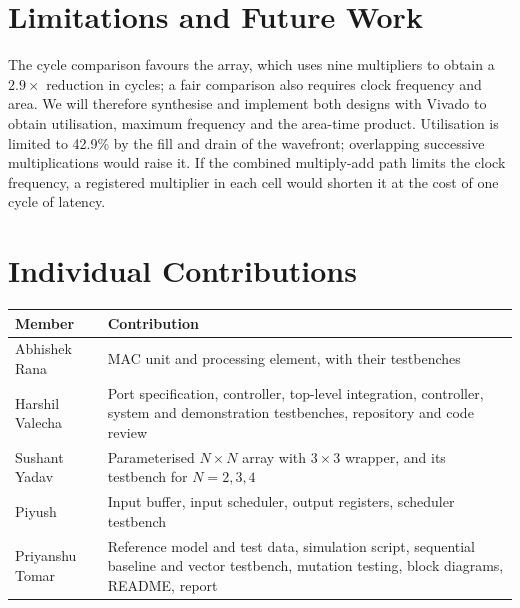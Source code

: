 \documentclass[conference]{IEEEtran}
\begin{document}
\section{Limitations and Future Work}
\label{sec:future}
The cycle comparison favours the array, which uses nine multipliers to obtain a $2.9\times$ reduction in cycles; a fair comparison also requires clock frequency and area. We will therefore synthesise and implement both designs with Vivado to obtain utilisation, maximum frequency and the area-time product. Utilisation is limited to 42.9\% by the fill and drain of the wavefront; overlapping successive multiplications would raise it. If the combined multiply-add path limits the clock frequency, a registered multiplier in each cell would shorten it at the cost of one cycle of latency.

\section{Individual Contributions}
\label{sec:contrib}
\begin{center}
\begin{tabular}{@{}lp{}@{}}
\toprule
Member & Contribution \\
\midrule
Abhishek Rana & MAC unit and processing element, with their testbenches \\
Harshil Valecha & Port specification, controller, top-level integration, controller, system and demonstration testbenches, repository and code review \\
Sushant Yadav & Parameterised $N \times N$ array with $3 \times 3$ wrapper, and its testbench for $N = 2, 3, 4$ \\
Piyush & Input buffer, input scheduler, output registers, scheduler testbench \\
Priyanshu Tomar & Reference model and test data, simulation script, sequential baseline and vector testbench, mutation testing, block diagrams, README, report \\
\bottomrule
\end{tabular}
\end{center}
\end{document}
